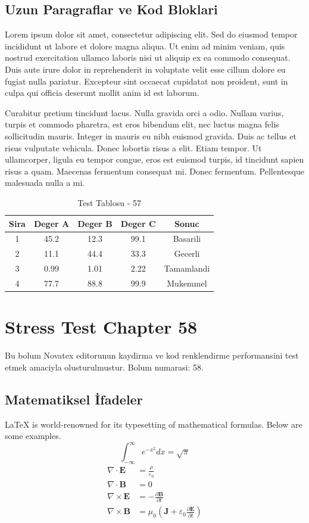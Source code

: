 \documentclass[12pt,a4paper]{article}
\begin{document}
\subsection{Uzun Paragraflar ve Kod Bloklari}
Lorem ipsum dolor sit amet, consectetur adipiscing elit. Sed do eiusmod tempor incididunt ut labore et dolore magna aliqua. Ut enim ad minim veniam, quis nostrud exercitation ullamco laboris nisi ut aliquip ex ea commodo consequat. Duis aute irure dolor in reprehenderit in voluptate velit esse cillum dolore eu fugiat nulla pariatur. Excepteur sint occaecat cupidatat non proident, sunt in culpa qui officia deserunt mollit anim id est laborum.

Curabitur pretium tincidunt lacus. Nulla gravida orci a odio. Nullam varius, turpis et commodo pharetra, est eros bibendum elit, nec luctus magna felis sollicitudin mauris. Integer in mauris eu nibh euismod gravida. Duis ac tellus et risus vulputate vehicula. Donec lobortis risus a elit. Etiam tempor. Ut ullamcorper, ligula eu tempor congue, eros est euismod turpis, id tincidunt sapien risus a quam. Maecenas fermentum consequat mi. Donec fermentum. Pellentesque malesuada nulla a mi.

\begin{table}[h!]
\centering
\begin{tabular}{|c|c|c|c|c|}
\hline
\textbf{Sira} & \textbf{Deger A} & \textbf{Deger B} & \textbf{Deger C} & \textbf{Sonuc} \\
\hline
1 & 45.2 & 12.3 & 99.1 & Basarili \\
2 & 11.1 & 44.4 & 33.3 & Gecerli \\
3 & 0.99 & 1.01 & 2.22 & Tamamlandi \\
4 & 77.7 & 88.8 & 99.9 & Mukemmel \\
\hline
\end{tabular}
\caption{Test Tablosu - 57}
\end{table}

\newpage
\section{Stress Test Chapter 58}
Bu bolum Novatex editorunun kaydirma ve kod renklendirme performansini test etmek amaciyla olusturulmustur. Bolum numarasi: 58.

\subsection{Matematiksel İfadeler}
\LaTeX{} is world-renowned for its typesetting of mathematical formulas. Below are some examples.
\begin{equation}
\int_{-\infty}^{\infty} e^{-x^2} dx = \sqrt{\pi}
\end{equation}
\begin{align}
\nabla \cdot \mathbf{E} &= \frac{\rho}{\varepsilon_0} \\
\nabla \cdot \mathbf{B} &= 0 \\
\nabla \times \mathbf{E} &= -\frac{\partial \mathbf{B}}{\partial t} \\
\nabla \times \mathbf{B} &= \mu_0\left(\mathbf{J} + \varepsilon_0 \frac{\partial \mathbf{E}}{\partial t}\right)
\end{align}
\end{document}
